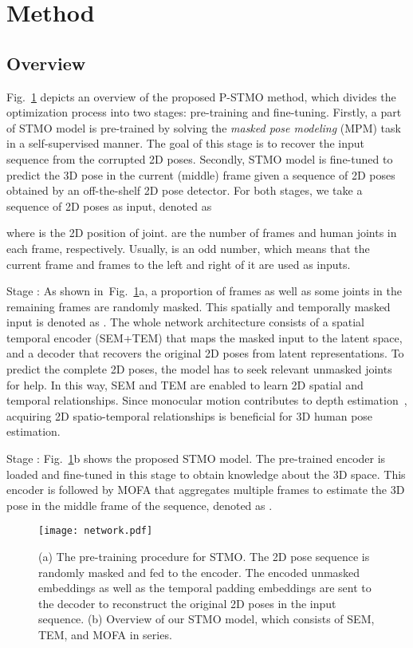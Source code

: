 \documentclass[]{llncs}
\newcommand{\RNum}[1]{\uppercase\expandafter{\romannumeral #1\relax}}
\begin{document}
\section{Method}




\subsection{Overview}

Fig.~\ref{fig:network} depicts an overview of the proposed P-STMO method, which divides the optimization process into two stages: pre-training and fine-tuning. Firstly, a part of STMO model is pre-trained by solving the \emph{masked pose modeling} (MPM) task in a self-supervised manner. The goal of this stage is to recover the input sequence from the corrupted 2D poses. Secondly, STMO model is fine-tuned to predict the 3D pose in the current (middle) frame given a sequence of 2D poses obtained by an off-the-shelf 2D pose detector. For both stages, we take a sequence of 2D poses as input, denoted as

where  is the 2D position of  joint.  are the number of frames and human joints in each frame, respectively. Usually,  is an odd number, which means that the current frame and  frames to the left and right of it are used as inputs.



Stage \RNum{1}: As shown in~Fig.~\ref{fig:network}a, a proportion of frames as well as some joints in the remaining frames are randomly masked. This spatially and temporally masked input is denoted as . The whole network architecture consists of a spatial temporal encoder (SEM+TEM) that maps the masked input  to the latent space, and a decoder that recovers the original 2D poses  from latent representations. To predict the complete 2D poses, the model has to seek relevant unmasked joints for help. In this way, SEM and TEM are enabled to learn 2D spatial and temporal relationships. Since monocular motion contributes to depth estimation~\cite{rogers1979motion}, acquiring 2D spatio-temporal relationships is beneficial for 3D human pose estimation.

Stage \RNum{2}: Fig.~\ref{fig:network}b shows the proposed STMO model. The pre-trained encoder is loaded and fine-tuned in this stage to obtain knowledge about the 3D space. This encoder is followed by MOFA that aggregates multiple frames to estimate the 3D pose in the middle frame of the sequence, denoted as .


\begin{figure}[t]
\centering
\texttt{[image: network.pdf]}
\vspace{-0.2cm}
\caption{(a) The pre-training procedure for STMO. The 2D pose sequence is randomly masked and fed to the encoder. The encoded unmasked embeddings as well as the temporal padding embeddings are sent to the decoder to reconstruct the original 2D poses in the input sequence. (b) Overview of our STMO model, which consists of SEM, TEM, and MOFA in series.}
\vspace{-0.8cm}
\label{fig:network}
\end{figure}
\end{document}
